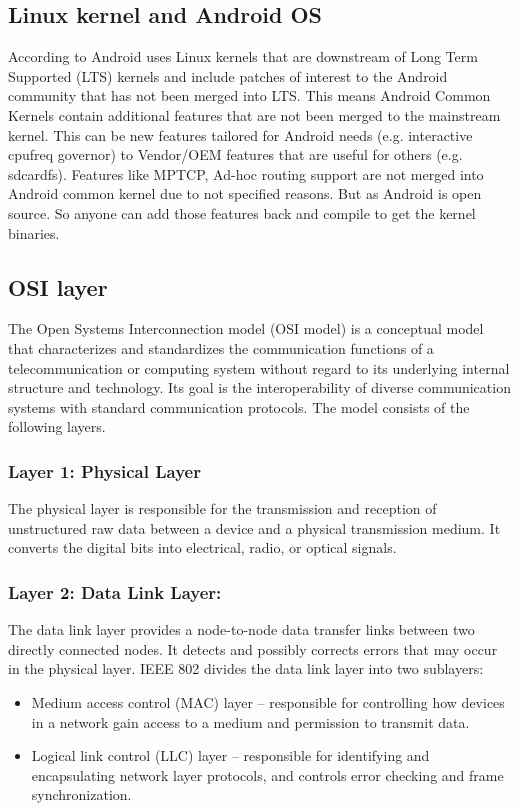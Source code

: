 \subsection{Linux kernel and Android  OS}
\vspace{12pt}
According to \cite{Android_kernel} Android uses Linux kernels that are downstream of Long Term Supported (LTS) kernels and include patches of interest to the Android community that has not been merged into LTS. This means Android  Common Kernels contain additional features that are not been merged to the mainstream kernel. This can be new features tailored for Android needs (e.g. interactive cpufreq governor) to Vendor/OEM features that are useful for others (e.g. sdcardfs). Features like MPTCP, Ad-hoc routing support are not merged into Android common kernel due to not specified reasons. But as Android is open source. So anyone can add those features back and compile to get the kernel binaries.
\vspace{12pt}
\subsection{OSI layer}
\vspace{12pt}
The Open Systems Interconnection model (OSI model) is a conceptual model that characterizes and standardizes the communication functions of a telecommunication or computing system without regard to its underlying internal structure and technology. Its goal is the interoperability of diverse communication systems with standard communication protocols. The model consists of the following layers.
\vspace{12pt}
\subsubsection{Layer 1: Physical Layer}
\vspace{12pt}
The physical layer is responsible for the transmission and reception of unstructured raw data between a device and a physical transmission medium. It converts the digital bits into electrical, radio, or optical signals.
\vspace{12pt}
\subsubsection{Layer 2: Data Link Layer:}
\vspace{12pt}
The data link layer provides a node-to-node data transfer links between two directly connected nodes. It detects and possibly corrects errors that may occur in the physical layer. 
IEEE 802 divides the data link layer into two sublayers:
\cite{Overview_Architecture}
\vspace{12pt}
\begin{itemize}
	\item Medium access control (MAC) layer – responsible for controlling how devices in a network gain access to a medium and permission to transmit data.
	\item Logical link control (LLC) layer – responsible for identifying and encapsulating network layer protocols, and controls error checking and frame synchronization.
\end{itemize}
\vspace{12pt}

